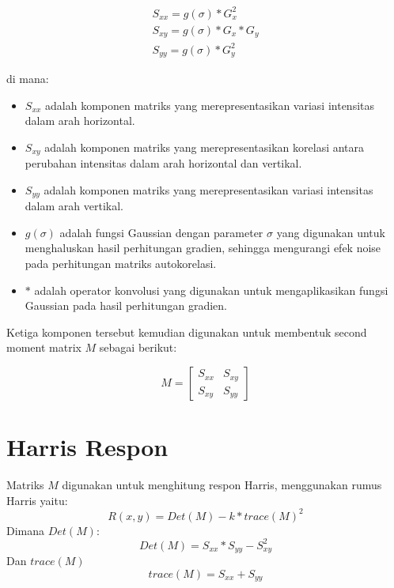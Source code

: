 \begin{equation}
    \begin{aligned}
        S_{xx} = g(\sigma) * G_{x}^2 \\
        S_{xy} = g(\sigma) * G_{x} * G_{y} \\
        S_{yy} = g(\sigma) * G_{y}^2
    \end{aligned}
\end{equation}

di mana:
\begin{itemize}
    \item \(S_{xx}\) adalah komponen matriks yang merepresentasikan variasi intensitas dalam arah horizontal.
    \item \(S_{xy}\) adalah komponen matriks yang merepresentasikan korelasi antara perubahan intensitas dalam arah horizontal dan vertikal.
    \item \(S_{yy}\) adalah komponen matriks yang merepresentasikan variasi intensitas dalam arah vertikal.
    \item \(g(\sigma)\) adalah fungsi Gaussian dengan parameter \(\sigma\) yang digunakan untuk menghaluskan hasil perhitungan gradien, sehingga mengurangi efek noise pada perhitungan matriks autokorelasi.
    \item \(*\) adalah operator konvolusi yang digunakan untuk mengaplikasikan fungsi Gaussian pada hasil perhitungan gradien.
\end{itemize} 
Ketiga komponen tersebut kemudian digunakan untuk membentuk second moment matrix \(M\) sebagai berikut:

\begin{equation}
    M = 
    \begin{bmatrix}
        S_{xx} & S_{xy} \\
        S_{xy} & S_{yy}
    \end{bmatrix} 
\end{equation}

\section{Harris Respon}
    Matriks \(M\) digunakan untuk menghitung respon Harris, menggunakan rumus Harris yaitu:
\begin{equation}
    R(x,y) = Det(M) - k * {trace(M)}^2
\end{equation}
Dimana \(Det(M)\):
\begin{equation*}
    Det(M) = S_{xx} * S_{yy} - S_{xy}^2
\end{equation*}
Dan \(trace(M)\) 
\begin{equation*}
    trace(M) = S_{xx} + S_{yy}
\end{equation*}

